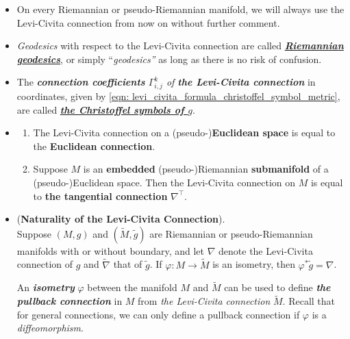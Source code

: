 \documentclass[11pt]{article}
\begin{document}
\begin{itemize}
\item \begin{remark}
On every Riemannian or pseudo-Riemannian manifold, we will always use the Levi-Civita connection from now on without further comment.
\end{remark}

\item \begin{remark}
\emph{Geodesics} with respect to the Levi-Civita connection are called \underline{\emph{\textbf{Riemannian geodesics}}}, or
simply ``\emph{geodesics”} as long as there is no risk of confusion. 
\end{remark}

\item \begin{remark}
The \emph{\textbf{connection coefficients} $\Gamma_{i,j}^{k}$ of \textbf{the Levi-Civita connection}} in coordinates, given by \eqref{eqn: levi_civita_formula_christoffel_symbol_metric}, are called \underline{\emph{\textbf{the Christoffel symbols of $g$}}}.
\end{remark}

\item \begin{proposition}
\begin{enumerate}
\item The Levi-Civita connection on a (pseudo-)\textbf{Euclidean space} is equal to the \textbf{Euclidean connection}.
\item Suppose $M$ is an \textbf{embedded} (pseudo-)Riemannian \textbf{submanifold} of a (pseudo-)Euclidean space. Then the Levi-Civita connection on $M$ is equal to\textbf{ the tangential connection} $\nabla^{\top}$.
\end{enumerate}
\end{proposition}

\item \begin{proposition} (\textbf{Naturality of the Levi-Civita Connection}). \citep{lee2018introduction}\\
Suppose $(M,g)$ and $(\widetilde{M}, \widetilde{g})$ are Riemannian or pseudo-Riemannian manifolds with or without boundary, and let $\nabla$ denote the Levi-Civita connection of $g$ and $\widetilde{\nabla}$ that of $\widetilde{g}$. If $\varphi: M \rightarrow \widetilde{M}$ is an isometry, then $\varphi^{*}\widetilde{g} = \nabla$.
\end{proposition}

\begin{remark} 
An \emph{\textbf{isometry}} $\varphi$ between the manifold $M$ and $ \widetilde{M}$ can be used to define \emph{\textbf{the pullback connection}} in $M$ from \emph{the  Levi-Civita connection} $\widetilde{M}$. Recall that for general connections, we can only define a pullback connection if $\varphi$ is a \emph{diffeomorphism}.
\end{remark}


\end{itemize}
\end{document}
